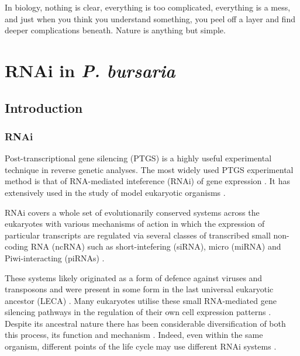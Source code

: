 \graphicspath{{chapters/6.Chapter_4/figures/}}

\begin{savequote}[75mm]
In biology, nothing is clear, everything is too complicated, everything is a mess, 
and just when you think you understand something, you peel off a layer and find 
deeper complications beneath. Nature is anything but simple.
\end{savequote}

\chapter{RNAi in \textit{P. bursaria}}

\section{Introduction}

\subsection{RNAi}

Post-transcriptional gene silencing (PTGS) is a highly useful experimental technique
in reverse genetic analyses.
The most widely used PTGS experimental method is that of RNA-mediated inteference (RNAi)
of gene expression \citep{Fire1998}. It has extensively used in the
study of model eukaryotic organisms \citep{Morf2013,Batista2011,Matthew2004,Ketting2011,Chang2012}.

RNAi covers a whole set of evolutionarily conserved systems across the eukaryotes 
with various mechanisms of action in which the expression of particular transcripts
are regulated via several classes of transcribed small non-coding RNA (ncRNA)
such as short-intefering (siRNA), micro (miRNA) and Piwi-interacting (piRNAs) \citep{Carthew2009}.

These systems likely originated as a form of defence against
viruses and transposons \citep{Waterhouse2001,Buchon2006}
and were present in some form in the last universal eukaryotic
ancestor (LECA) \citep{Cerutti2006,Shabalina2008}.  Many eukaryotes
utilise these small RNA-mediated gene silencing pathways
in the regulation of their own cell expression patterns \citep{Wu2008}.
Despite its ancestral nature there has been considerable diversification
of both this process, its function and mechanism \citep{Ketting2011}.
Indeed, even within the same organism, different points of the life cycle
may use different RNAi systems \citep{Flemr2013}.


